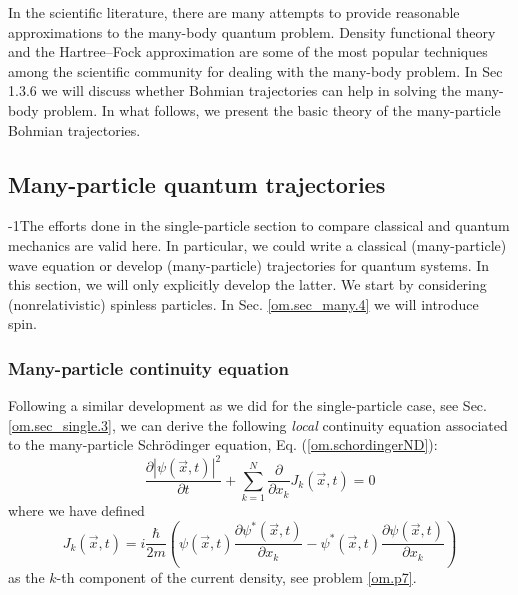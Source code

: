 \documentclass[onecolumn,nofootinbib, secnumarabic, amsmath, nobibnotes,12pt,aps,pra]{revtex4-1}
\newcommand{\sref}[1]{Sec. \ref{#1}}
\newcommand{\eref}[1]{Eq. (\ref{#1})}
\begin{document}
In the scientific literature, there are many attempts to provide
reasonable approximations to the many-body quantum problem. Density
functional theory \cite{om.kohn1964,om.kohn1965} and the
Hartree--Fock approximation \cite{om.Hartree,om.Hartree2,om.Fock} are
some of the most popular techniques among the scientific community
for dealing with the many-body problem. In Sec 1.3.6 we
will discuss whether Bohmian trajectories can help in solving the
many-body problem. In what follows, we present the basic theory of
the many-particle Bohmian trajectories.

\subsection{Many-particle quantum trajectories}\label{om.sec_many.2}

\looseness-1The efforts done in the single-particle section to compare classical
and quantum mechanics are valid here. In particular, we could write
a classical (many-particle) wave equation or develop (many-particle)
trajectories for quantum systems. In this section, we will only
explicitly develop the latter. We start by considering
(nonrelativistic) spinless particles. In \sref{om.sec_many.4} we
will introduce spin.

\subsubsection{Many-particle continuity equation}

Following a similar development as we did for the single-particle
case, see \sref{om.sec_single.3}, we can derive the following
\textit{local} continuity equation associated to the many-particle
Schr\"odinger equation, \eref{om.schordingerND}:
\begin{equation}
\label{om.continuityND}
 \frac{\partial |\psi(\vec{x},t)|^2} {\partial t} + \sum_{k = 1}^{N} \frac { \partial}  {\partial x_k}  J_k(\vec{x},t) = 0  
\end{equation}
where we have defined
\begin{equation}
\label{om.currentND}
J_k(\vec{x},t) = i \frac {\hbar} {2 m} \left(\psi(\vec{x},t) \frac {\partial \psi^{*}(\vec{x},t)} {\partial x_k}- \psi^{*}(\vec{x},t) \frac {\partial \psi(\vec{x},t)} {\partial x_k} \right)
\end{equation}
as the $k$-th component of the current density, see problem \ref{om.p7}.
\end{document}
